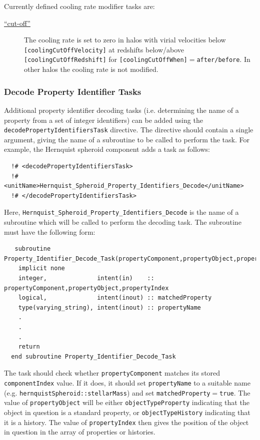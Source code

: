 Currently defined cooling rate modifier tasks are:
\begin{description}
\item [\hyperlink{cooling.cooling_rate.modifier.cut_off.F90:cooling_rates_modifier_cut_off:cooling_rate_modifier_cut_off}{``cut-off''}] The cooling rate is set to zero in halos with virial velocities below {\tt [coolingCutOffVelocity]} at redshifts below/above {\tt [coolingCutOffRedshift]} for {\tt [coolingCutOffWhen]}$=${\tt after/before}. In other halos the cooling rate is not modified.
\end{description}

\subsubsection{Decode Property Identifier Tasks}\label{sec:DecodePropertyIndentifierTask}

Additional property identifier decoding tasks (i.e. determining the name of a property from a set of integer identifiers) can be added using the {\tt decodePropertyIdentifiersTask} directive. The directive should contain a single argument, giving the name of a subroutine to be called to perform the task. For example, the Hernquist spheroid component adds a task as follows:
\begin{verbatim}
  !# <decodePropertyIdentifiersTask>
  !#  <unitName>Hernquist_Spheroid_Property_Identifiers_Decode</unitName>
  !# </decodePropertyIdentifiersTask>
\end{verbatim}
Here, {\tt Hernquist\_Spheroid\_Property\_Identifiers\_Decode} is the name of a subroutine which will be called to perform the decoding task. The subroutine must have the following form:
\begin{verbatim}
   subroutine Property_Identifier_Decode_Task(propertyComponent,propertyObject,propertyIndex,matchedProperty,propertyName)
    implicit none
    integer,              intent(in)    :: propertyComponent,propertyObject,propertyIndex
    logical,              intent(inout) :: matchedProperty
    type(varying_string), intent(inout) :: propertyName
    .
    .
    .
    return
  end subroutine Property_Identifier_Decode_Task
\end{verbatim}
The task should check whether {\tt propertyComponent} matches its stored {\tt componentIndex} value. If it does, it should set {\tt propertyName} to a suitable name (e.g. {\tt hernquistSpheroid::stellarMass}) and set {\tt matchedProperty}$=${\tt true}. The value of {\tt propertyObject} will be either {\tt objectTypeProperty} indicating that the object in question is a standard property, or {\tt objectTypeHistory} indicating that it is a history. The value of {\tt propertyIndex} then gives the position of the object in question in the array of properties or histories.

